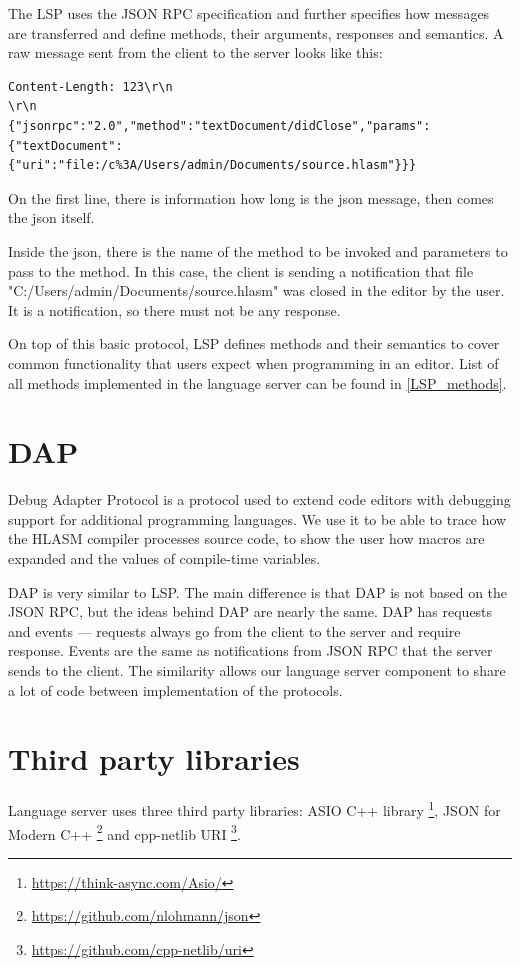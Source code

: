 The LSP uses the JSON RPC specification and further specifies how messages are transferred and define methods, their arguments, responses and semantics. A raw message sent from the client to the server looks like this:
\begin{verbatim}
Content-Length: 123\r\n
\r\n
{"jsonrpc":"2.0","method":"textDocument/didClose","params":{"textDocument":
{"uri":"file:/c%3A/Users/admin/Documents/source.hlasm"}}}
\end{verbatim}
On the first line, there is information how long is the json message, then comes the json itself.

Inside the json, there is the name of the method to be invoked and parameters to pass to the method. In this case, the client is sending a notification that file "C:/Users/admin/Documents/source.hlasm" was closed in the editor by the user. It is a notification, so there must not be any response.

On top of this basic protocol, LSP defines methods and their semantics to cover common functionality that users expect when programming in an editor. List of all methods implemented in the language server can be found in \cref{LSP_methods}.

\section{DAP}
Debug Adapter Protocol is a protocol used to extend code editors with debugging support for additional programming languages. We use it to be able to trace how the HLASM compiler processes source code, to show the user how macros are expanded and the values of compile-time variables.

DAP is very similar to LSP. The main difference is that DAP is not based on the JSON RPC, but the ideas behind DAP are nearly the same. DAP has requests and events ---  requests always go from the client to the server and require response. Events are the same as notifications from JSON RPC that the server sends to the client. The similarity allows our language server component to share a lot of code between implementation of the protocols.

\section{Third party libraries}
Language server uses three third party libraries: ASIO C++ library \footnote{\url{https://think-async.com/Asio/}}, JSON for Modern C++ \footnote{\url{https://github.com/nlohmann/json}} and 
cpp-netlib URI \footnote{\url{https://github.com/cpp-netlib/uri}}.

